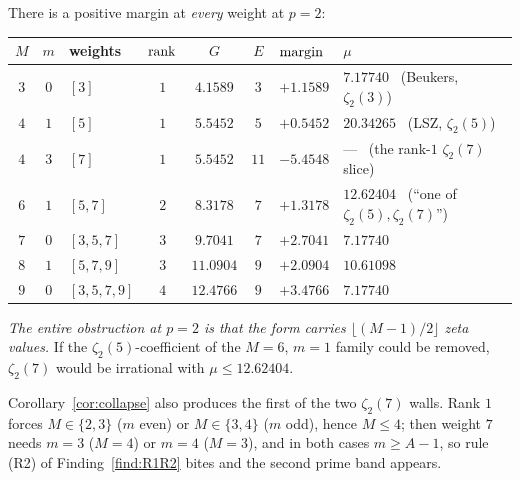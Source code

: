 \begin{finding}[size is not the problem at $p=2$; rank is]\label{find:sizenotproblem}
 There is a positive margin at \emph{every} weight at $p=2$:
\begin{center}
\tabsmall
\begin{tabular}{cclcccll}
\toprule
$M$ & $m$ & weights & $\operatorname{rank}$ & $G$ & $E$ & $\operatorname{margin}$ & $\mu$\\
\midrule
$3$ & $0$ & $[3]$ & $1$ & $4.1589$ & $3$ & $+1.1589$ & $7.17740$ \ (Beukers, $\zeta_2(3)$)\\
$4$ & $1$ & $[5]$ & $1$ & $5.5452$ & $5$ & $+0.5452$ & $20.34265$ \ (LSZ, $\zeta_2(5)$)\\
$4$ & $3$ & $[7]$ & $1$ & $5.5452$ & $11$ & $-5.4548$ & --- \ (the rank-$1$ $\zeta_2(7)$ slice)\\
$6$ & $1$ & $[5,7]$ & $2$ & $8.3178$ & $7$ & $+1.3178$ & $12.62404$ \ (``one of $\zeta_2(5),\zeta_2(7)$'')\\
$7$ & $0$ & $[3,5,7]$ & $3$ & $9.7041$ & $7$ & $+2.7041$ & $7.17740$\\
$8$ & $1$ & $[5,7,9]$ & $3$ & $11.0904$ & $9$ & $+2.0904$ & $10.61098$\\
$9$ & $0$ & $[3,5,7,9]$ & $4$ & $12.4766$ & $9$ & $+3.4766$ & $7.17740$\\
\bottomrule
\end{tabular}
\end{center}
\emph{The entire obstruction at $p=2$ is that the form carries $\lfloor(M-1)/2\rfloor$ zeta
values.} If the $\zeta_2(5)$-coefficient of the $M=6$, $m=1$ family could be removed,
$\zeta_2(7)$ would be irrational with $\mu\le12.62404$.
\end{finding}

Corollary~\ref{cor:collapse} also produces the first of the two $\zeta_2(7)$ walls. Rank $1$
forces $M\in\{2,3\}$ ($m$ even) or $M\in\{3,4\}$ ($m$ odd), hence $M\le4$; then weight $7$
needs $m=3$ ($M=4$) or $m=4$ ($M=3$), and in both cases $m\ge A-1$, so rule (R2) of
Finding~\ref{find:R1R2} bites and the second prime band appears.

\begin{center}\end{center}

